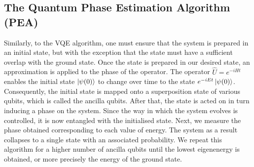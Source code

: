 \documentclass[12pt]{article}
\begin{document}
\subsection{The Quantum Phase Estimation Algorithm (PEA)}
Similarly, to the VQE algorithm, one must ensure that the system is prepared in an initial state, but with the exception that the state must have a sufficient overlap with the ground state. Once the state is prepared in our desired state, an approximation is applied to the phase of the operator. The operator $\hat{U} = e^{-iHt}$ enables the initial state $\ket{\psi(0)}$ to change over time to the state $e^{-iEt}\ket{\psi(0)}$. Consequently, the initial state is mapped onto a superposition state of various qubits, which is called the ancilla qubits. After that, the state is acted on in turn inducing a phase on the system. Since the way in which the system evolves is controlled, it is now entangled with the initialised state. Next, we measure the phase obtained corresponding to each value of energy. The system as a result collapses to a single state with an associated probability. We repeat this algorithm for a higher number of ancilla qubits \cite[p.2]{tansuwannont2015quantum} until the lowest eigenenergy is obtained, or more precisely the energy of the ground state.\\

\noindent\setlength{\fboxsep}{0.5em}
\\
\end{document}
